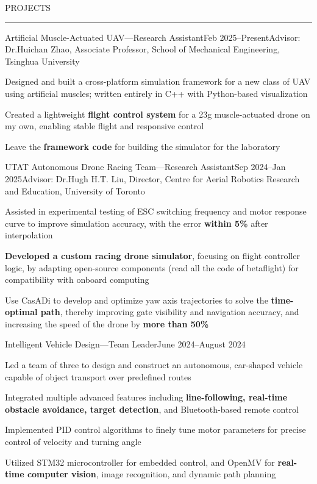 \documentclass{resume} %
\renewenvironment{rSection}[1]{
\sectionskip
\textcolor{TsinghuaPurple}{\MakeUppercase{#1}}
\sectionlineskip
\hrule
\begin{list}{}{
\setlength{\leftmargin}{0em}
}
\item[]
}{
\end{list}
}
\begin{document}
\begin{rSection}{PROJECTS}

    \begin{rSubsection}{Artificial Muscle-Actuated UAV---Research Assistant}{Feb 2025--Present}{Advisor: Dr.Huichan Zhao, Associate Professor, School of Mechanical Engineering, Tsinghua University}{}
        \item Designed and built a cross-platform simulation framework for a new class of UAV using artificial muscles; written entirely in C++ with Python-based visualization
        \item Created a lightweight \textbf{flight control system} for a 23g muscle-actuated drone on my own, enabling stable flight and responsive control
        \item Leave the \textbf{framework code} for building the simulator for the laboratory
    \end{rSubsection}

    \begin{rSubsection}{UTAT Autonomous Drone Racing Team---Research Assistant}{Sep 2024--Jan 2025}{Advisor: Dr.Hugh H.T. Liu, Director, Centre for Aerial Robotics Research and Education, University of Toronto}{}    
        \item Assisted in experimental testing of ESC switching frequency and motor response curve to improve simulation accuracy, with the error \textbf{within 5\%} after interpolation
        \item \textbf{Developed a custom racing drone simulator}, focusing on flight controller logic, by adapting open-source components (read all the code of betaflight) for compatibility with onboard computing
        \item Use CasADi to develop and optimize yaw axis trajectories to solve the \textbf{time-optimal path}, thereby improving gate visibility and navigation accuracy, and increasing the speed of the drone by \textbf{more than 50\%}
    \end{rSubsection} 

    \begin{rSubsection}{Intelligent Vehicle Design---Team Leader}{June 2024--August 2024}{}{}
    \item Led a team of three to design and construct an autonomous, car-shaped vehicle capable of object transport over predefined routes
    \item Integrated multiple advanced features including \textbf{line-following, real-time obstacle avoidance, target detection}, and Bluetooth-based remote control
    \item Implemented PID control algorithms to finely tune motor parameters for precise control of velocity and turning angle
    \item Utilized STM32 microcontroller for embedded control, and OpenMV for \textbf{real-time computer vision}, image recognition, and dynamic path planning
    \end{rSubsection}


\end{rSection}
\end{document}
